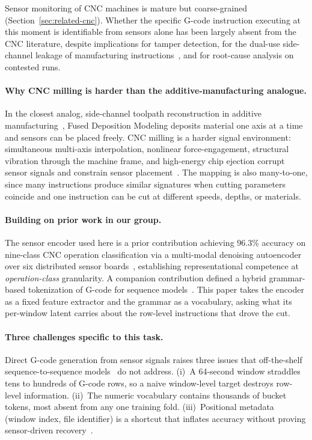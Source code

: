 \documentclass[sensors,article,submit,moreauthors,pdftex]{Definitions/mdpi}
\begin{document}
Sensor monitoring of CNC machines is mature but coarse-grained (Section~\ref{sec:related-cnc}). Whether the specific G-code instruction executing at this moment is identifiable from sensors alone has been largely absent from the CNC literature, despite implications for tamper detection, for the dual-use side-channel leakage of manufacturing instructions~\cite{alfaruque2016acoustic,song2016my,chhetri2016kcad,chhetri2017confidentiality,jamarani2024screg,chattopadhyay2025video}, and for root-cause analysis on contested runs.

\paragraph{Why CNC milling is harder than the additive-manufacturing analogue.} In the closest analog, side-channel toolpath reconstruction in additive manufacturing~\cite{alfaruque2016acoustic,song2016my,chhetri2016kcad}, Fused Deposition Modeling deposits material one axis at a time and sensors can be placed freely. CNC milling is a harder signal environment: simultaneous multi-axis interpolation, nonlinear force-engagement, structural vibration through the machine frame, and high-energy chip ejection corrupt sensor signals and constrain sensor placement~\cite{teti2010advanced,wang2018deep}. The mapping is also many-to-one, since many instructions produce similar signatures when cutting parameters coincide and one instruction can be cut at different speeds, depths, or materials.

\paragraph{Building on prior work in our group.} The sensor encoder used here is a prior contribution achieving 96.3\% accuracy on nine-class CNC operation classification via a multi-modal denoising autoencoder over six distributed sensor boards~\cite{encoder_paper}, establishing representational competence at \emph{operation-class} granularity. A companion contribution defined a hybrid grammar-based tokenization of G-code for sequence models~\cite{grammar_paper}. This paper takes the encoder as a fixed feature extractor and the grammar as a vocabulary, asking what its per-window latent carries about the row-level instructions that drove the cut.

\paragraph{Three challenges specific to this task.} Direct G-code generation from sensor signals raises three issues that off-the-shelf sequence-to-sequence models~\cite{sutskever2014sequence,bahdanau2014neural,vaswani2017attention,graves2013speech} do not address. (i)~A 64-second window straddles tens to hundreds of G-code rows, so a naive window-level target destroys row-level information. (ii)~The numeric vocabulary contains thousands of bucket tokens, most absent from any one training fold. (iii)~Positional metadata (window index, file identifier) is a shortcut that inflates accuracy without proving sensor-driven recovery~\cite{meyes2019ablation,jia2016deep}.
\end{document}
